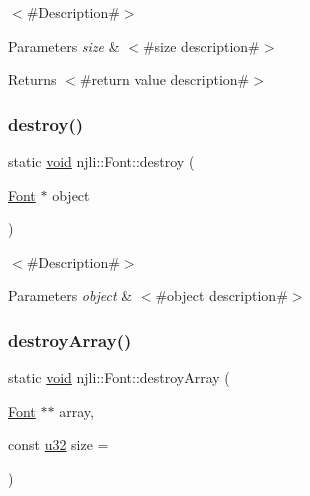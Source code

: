 $<$\#\+Description\#$>$


\begin{DoxyParams}{Parameters}
{\em size} & $<$\#size description\#$>$\\
\hline
\end{DoxyParams}
\begin{DoxyReturn}{Returns}
$<$\#return value description\#$>$ 
\end{DoxyReturn}
\mbox{\label{classnjli_1_1_font_a618f71d7b128184b48567594d821016b}} 
\subsubsection{\texorpdfstring{destroy()}{destroy()}}
{\footnotesize\ttfamily static \mbox{\hyperlink{_thread_8h_af1e856da2e658414cb2456cb6f7ebc66}{void}} njli\+::\+Font\+::destroy (\begin{DoxyParamCaption}\item[{\mbox{\hyperlink{classnjli_1_1_font}{Font}} $\ast$}]{object }\end{DoxyParamCaption})\hspace{0.3cm}{\ttfamily [static]}}

$<$\#\+Description\#$>$


\begin{DoxyParams}{Parameters}
{\em object} & $<$\#object description\#$>$ \\
\hline
\end{DoxyParams}
\mbox{\label{classnjli_1_1_font_ad9e4b917edccd15dabcbdab0db46c2a4}} 
\subsubsection{\texorpdfstring{destroy\+Array()}{destroyArray()}}
{\footnotesize\ttfamily static \mbox{\hyperlink{_thread_8h_af1e856da2e658414cb2456cb6f7ebc66}{void}} njli\+::\+Font\+::destroy\+Array (\begin{DoxyParamCaption}\item[{\mbox{\hyperlink{classnjli_1_1_font}{Font}} $\ast$$\ast$}]{array,  }\item[{const \mbox{\hyperlink{_util_8h_a10e94b422ef0c20dcdec20d31a1f5049}{u32}}}]{size = {} }\end{DoxyParamCaption})\hspace{0.3cm}{\ttfamily [static]}}

